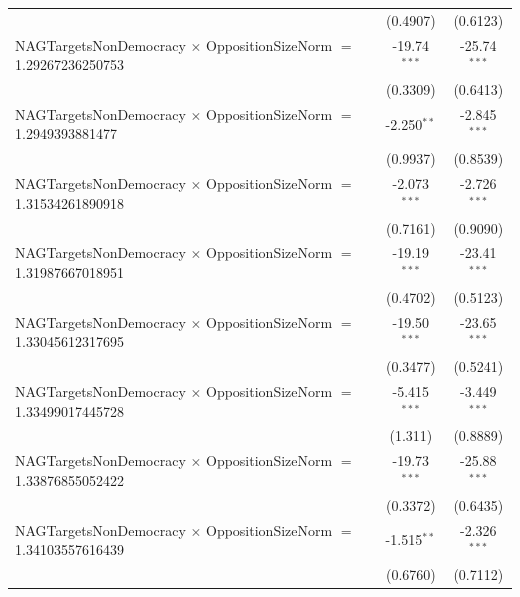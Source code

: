 \begin{tabular}{lcc}
                                                                                & (0.4907)             & (0.6123)\\   
   NAGTargetsNonDemocracy $\times$ OppositionSizeNorm $=$ 1.29267236250753      & -19.74$^{***}$       & -25.74$^{***}$\\   
                                                                                & (0.3309)             & (0.6413)\\   
   NAGTargetsNonDemocracy $\times$ OppositionSizeNorm $=$ 1.2949393881477       & -2.250$^{**}$        & -2.845$^{***}$\\   
                                                                                & (0.9937)             & (0.8539)\\   
   NAGTargetsNonDemocracy $\times$ OppositionSizeNorm $=$ 1.31534261890918      & -2.073$^{***}$       & -2.726$^{***}$\\   
                                                                                & (0.7161)             & (0.9090)\\   
   NAGTargetsNonDemocracy $\times$ OppositionSizeNorm $=$ 1.31987667018951      & -19.19$^{***}$       & -23.41$^{***}$\\   
                                                                                & (0.4702)             & (0.5123)\\   
   NAGTargetsNonDemocracy $\times$ OppositionSizeNorm $=$ 1.33045612317695      & -19.50$^{***}$       & -23.65$^{***}$\\   
                                                                                & (0.3477)             & (0.5241)\\   
   NAGTargetsNonDemocracy $\times$ OppositionSizeNorm $=$ 1.33499017445728      & -5.415$^{***}$       & -3.449$^{***}$\\   
                                                                                & (1.311)              & (0.8889)\\   
   NAGTargetsNonDemocracy $\times$ OppositionSizeNorm $=$ 1.33876855052422      & -19.73$^{***}$       & -25.88$^{***}$\\   
                                                                                & (0.3372)             & (0.6435)\\   
   NAGTargetsNonDemocracy $\times$ OppositionSizeNorm $=$ 1.34103557616439      & -1.515$^{**}$        & -2.326$^{***}$\\   
                                                                                & (0.6760)             & (0.7112)\\   

\end{tabular}
